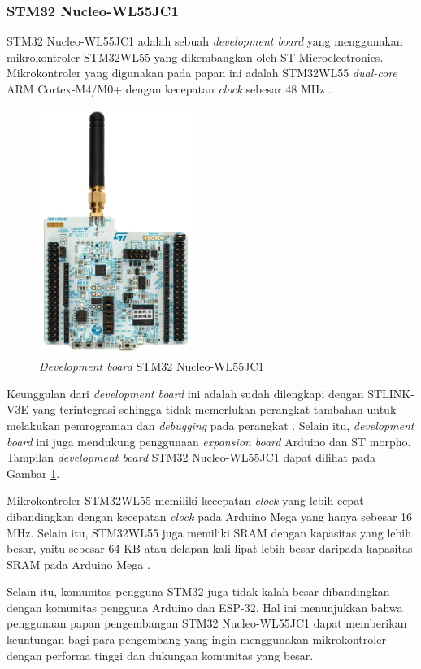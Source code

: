 \subsubsection{STM32 Nucleo-WL55JC1}
STM32 Nucleo-WL55JC1 adalah sebuah \textit{development board} yang menggunakan mikrokontroler STM32WL55 yang dikembangkan oleh ST Microelectronics. Mikrokontroler yang digunakan pada papan ini adalah STM32WL55 \textit{dual-core} ARM Cortex-M4/M0+ dengan kecepatan \textit{clock} sebesar 48 MHz \cite{STMicroelectronics2022}.

\begin{figure}[H]
	\centering
	\includegraphics[width=5cm]{contents/chapter-2/stm32-wl55jc1.jpg}
	\caption{\textit{Development board} STM32 Nucleo-WL55JC1}
	\label{Fig: STM32 Nucleo-WL55JC1}
\end{figure}

Keunggulan dari \textit{development board} ini adalah sudah dilengkapi dengan STLINK-V3E yang terintegrasi sehingga tidak memerlukan perangkat tambahan untuk melakukan pemrograman dan \textit{debugging} pada perangkat \cite{STMicroelectronics2022}. Selain itu, \textit{development board} ini juga mendukung penggunaan \textit{expansion board} Arduino dan ST morpho. Tampilan \textit{development board} STM32 Nucleo-WL55JC1 dapat dilihat pada Gambar \ref{Fig: STM32 Nucleo-WL55JC1}.

Mikrokontroler STM32WL55 memiliki kecepatan \textit{clock} yang lebih cepat dibandingkan dengan kecepatan \textit{clock} pada Arduino Mega yang hanya sebesar 16 MHz. Selain itu, STM32WL55 juga memiliki SRAM dengan kapasitas yang lebih besar, yaitu sebesar 64 KB atau delapan kali lipat lebih besar daripada kapasitas SRAM pada Arduino Mega \cite{STMicroelectronics2022b}.

Selain itu, komunitas pengguna STM32 juga tidak kalah besar dibandingkan dengan komunitas pengguna Arduino dan ESP-32. Hal ini menunjukkan bahwa penggunaan papan pengembangan STM32 Nucleo-WL55JC1 dapat memberikan keuntungan bagi para pengembang yang ingin menggunakan mikrokontroler dengan performa tinggi dan dukungan komunitas yang besar.

